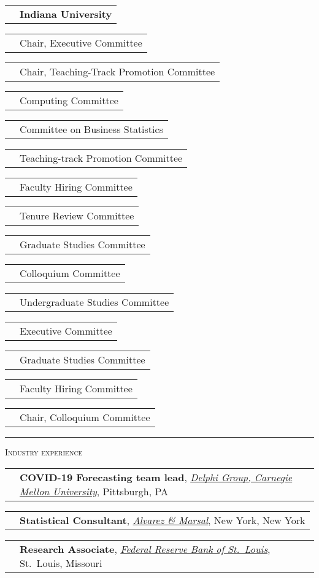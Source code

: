 \documentclass[11pt,letterpaper]{minimal/moderncv}
\makeatletter
\newcommand{\xx}{\textcolor{white}{2022}}
\newcommand{\xxx}{\textcolor{white}{--2022}}
\renewcommand{\cventry}[2]{\cvitem{#1}{\begin{minipage}[t]{\maincolumnwidth}#2\end{minipage}}}
\renewcommand{\section}[1]{  \par\addvspace{15pt}%
  \parbox[t]{\hintscolumnwidth}{\strut\raggedleft\raisebox{4pt}%
  {\rule{\hintscolumnwidth}{2pt}}}%
  \hspace{\separatorcolumnwidth}%
  \textsc{\Large #1}\par\nobreak\addvspace{6pt}%
}
\renewcommand*{\cvitem}[2]{%
  \begin{tabular}{@{}p{\hintscolumnwidth}@{\hspace{\separatorcolumnwidth}}%
    p{\maincolumnwidth}@{}}%
    \raggedleft {#1} &  {#2}%
  \end{tabular}%
}
\makeatother
\begin{document}
\vspace{6pt}
\cvitem{}{\textbf{Indiana University}}
\cvitem{2019--2020}{Chair, Executive Committee}

\cvitem{2019--2020}{Chair, Teaching-Track Promotion Committee}

\cvitem{2019--2020}{Computing Committee}

\cvitem{2019--2020}{Committee on Business Statistics}

\cvitem{2018--2020}{Teaching-track Promotion Committee}

\cvitem{2018--2020}{Faculty Hiring Committee}

\cvitem{2018--2020}{Tenure Review Committee}

\cvitem{2016--2020}{Graduate Studies Committee}

\cvitem{2012--2018}{Colloquium Committee}

\cvitem{2015--2016}{Undergraduate Studies Committee}

\cvitem{2015--2016}{Executive Committee}

\cvitem{2012--2015}{Graduate Studies Committee}

\cvitem{2012--2015}{Faculty Hiring Committee}

\cvitem{2013--2014}{Chair, Colloquium Committee}

\section{Industry experience}

\cventry{2020--\xx}{\textbf{COVID-19 Forecasting team lead},
  \emph{\href{https://delphi.cmu.edu}{Delphi Group, Carnegie Mellon
      University}}, Pittsburgh, PA}

\cventry{2010\xxx}{\textbf{Statistical Consultant}, \emph{\href{http://www.alvarezandmarsal.com/}{Alvarez \& Marsal}},
  New York, New York}

\cventry{2006--2007}{\textbf{Research Associate}, \emph{\href{http://www.stlouisfed.org/}{Federal Reserve Bank of
    St.\ Louis}}, St.\ Louis, Missouri}

    
\end{document}
